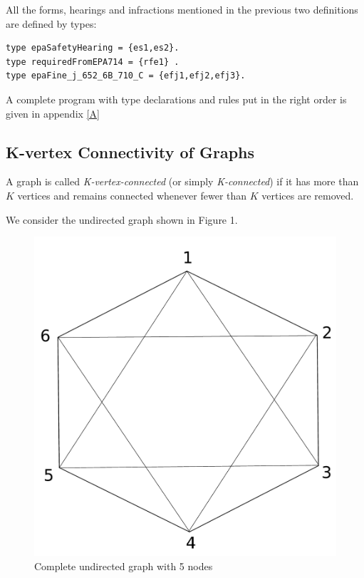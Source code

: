 \documentclass[a4paper,10pt]{article}
\begin{document}
\medskip\noindent
All the forms, hearings and infractions mentioned in the previous two definitions are defined by types:

\begin{verbatim}
type epaSafetyHearing = {es1,es2}.
type requiredFromEPA714 = {rfe1} .
type epaFine_j_652_6B_710_C = {efj1,efj2,efj3}.
\end{verbatim}

\medskip\noindent
A complete program with type declarations and rules put in the right order is given in appendix \ref{A}
   
\subsection{K-vertex Connectivity of Graphs}

A graph is called \textit{K-vertex-connected} (or simply \textit{K-connected})  if it has more than $K$ vertices and remains connected whenever fewer than $K$ vertices are removed.

\medskip\noindent
We consider the undirected graph shown in Figure 1.


\begin{figure}[h!]
\centering
\includegraphics[scale=0.3]{drawing}
\caption{Complete undirected graph with 5 nodes}
\end{figure}\label{fig1}
\end{document}
